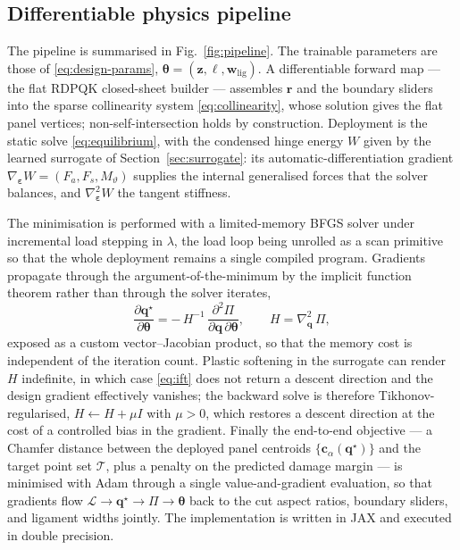 \documentclass[pdflatex,sn-mathphys-num]{sn-jnl}%
\theoremstyle{thmstyleone}%
\theoremstyle{thmstyletwo}%
\theoremstyle{thmstylethree}%
\newcommand{\epsh}{\bm{\varepsilon}}
\begin{document}
\subsection{Differentiable physics pipeline}
\label{sec:pipeline}

The pipeline is summarised in Fig.~\ref{fig:pipeline}. The trainable parameters
are those of \eqref{eq:design-params},
$\bm{\theta}=(\bm{z},\bm{\ell},\bm{w}_{\mathrm{lig}})$. A differentiable forward
map --- the flat RDPQK closed-sheet builder --- assembles $\bm{r}$ and the
boundary sliders into the sparse collinearity system \eqref{eq:collinearity},
whose solution gives the flat panel vertices; non-self-intersection holds by
construction. Deployment is the static solve \eqref{eq:equilibrium}, with the
condensed hinge energy $W$ given by the learned surrogate of
Section~\ref{sec:surrogate}: its automatic-differentiation gradient
$\nabla_{\epsh} W=(F_a,F_s,M_\vartheta)$ supplies the internal generalised forces
that the solver balances, and $\nabla^2_{\epsh} W$ the tangent stiffness.

The minimisation is performed with a limited-memory BFGS solver under incremental
load stepping in $\lambda$, the load loop being unrolled as a scan primitive so
that the whole deployment remains a single compiled program. Gradients propagate
through the argument-of-the-minimum by the implicit function theorem rather than
through the solver iterates,
\begin{equation}
  \frac{\partial \bm{q}^\star}{\partial \bm{\theta}}
    = -\,H^{-1}\,\frac{\partial^2 \Pi}{\partial \bm{q}\,\partial \bm{\theta}},
  \qquad
  H = \nabla^2_{\bm{q}}\,\Pi ,
  \label{eq:ift}
\end{equation}
exposed as a custom vector--Jacobian product, so that the memory cost is
independent of the iteration count. Plastic softening in the surrogate can render
$H$ indefinite, in which case \eqref{eq:ift} does not return a descent direction
and the design gradient effectively vanishes; the backward solve is therefore
Tikhonov-regularised, $H\leftarrow H+\mu I$ with $\mu>0$, which restores a descent
direction at the cost of a controlled bias in the gradient. Finally the end-to-end
objective --- a Chamfer distance between the deployed panel centroids
$\{\bm{c}_\alpha(\bm{q}^\star)\}$ and the target point set $\mathcal{T}$, plus a
penalty on the predicted damage margin --- is minimised with Adam through a single
value-and-gradient evaluation, so that gradients flow
$\mathcal{L}\to\bm{q}^\star\to\Pi\to\bm{\theta}$ back to the cut aspect ratios,
boundary sliders, and ligament widths jointly. The implementation is written in
JAX and executed in double precision.
\end{document}

